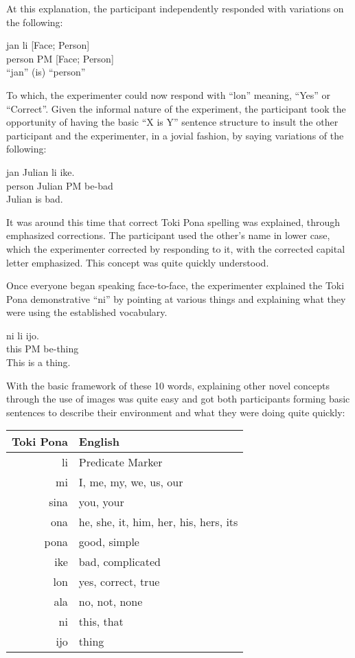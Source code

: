 \documentclass[a4paper,10pt]{article}
\begin{document}
At this explanation, the participant independently responded with variations
on the following:

\begin{exe}
 \ex
 \gll jan li [Face; Person] \\
 person PM [Face; Person] \\
 \glt ``jan'' (is) ``person''
\end{exe}

To which, the experimenter could now respond with ``lon'' meaning, ``Yes'' or
``Correct''. Given the informal nature of the experiment, the participant
took the opportunity of having the basic ``X is Y'' sentence structure
to insult the other participant and the experimenter, in a jovial fashion,
by saying variations of the following:

\begin{exe}
 \ex
 \gll jan Julian li ike. \\
 person Julian PM be-bad \\
 \glt Julian is bad.
\end{exe}

It was around this time that correct Toki Pona spelling was explained, through
emphasized corrections. The participant used the other's name in lower case,
which the experimenter corrected by responding to it, with the corrected capital
letter emphasized. This concept was quite quickly understood.

Once everyone began speaking face-to-face, the experimenter explained the Toki Pona
demonstrative ``ni'' by pointing at various things and explaining what they
were using the established vocabulary. 

\begin{exe}
 \ex
 \gll ni li ijo. \\
 this PM be-thing \\
 \glt This is a thing.
\end{exe}

With the basic framework of these 10 words, explaining other novel concepts
through the use of images was quite easy and got both participants forming
basic sentences to describe their environment and what they were doing
quite quickly:

\begin{tabular}{ r | l }
 Toki Pona & English \\
 \hline
 li & Predicate Marker \\
 mi & I, me, my, we, us, our \\
 sina & you, your \\
 ona & he, she, it, him, her, his, hers, its \\
 pona & good, simple \\
 ike & bad, complicated \\
 lon & yes, correct, true \\
 ala & no, not, none \\
 ni & this, that \\
 ijo & thing \\
 \hline  
\end{tabular}
\end{document}
